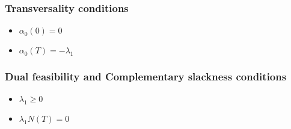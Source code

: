 \documentclass{article}
\begin{document}
\subsubsection{Transversality conditions}
\begin{itemize}
    \item $\alpha_{0}{\left(0 \right)} = 0$
    \item $\alpha_{0}{\left(T \right)} = - \lambda_{1}$
\end{itemize}

\subsubsection{Dual feasibility and Complementary slackness conditions}
\begin{itemize}
    \item $\lambda_{1} \geq 0$
    \item $\lambda_{1} N{\left(T \right)} = 0$
\end{itemize}
\end{document}
